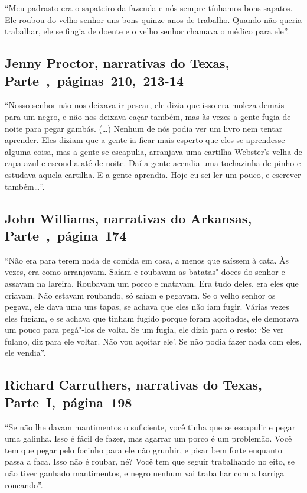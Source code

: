 ``Meu padrasto era o sapateiro da fazenda e nós sempre tínhamos bons
sapatos. Ele roubou do velho senhor uns bons quinze anos de trabalho.
Quando não queria trabalhar, ele se fingia de doente e o velho senhor
chamava o médico para ele''.

\subsection{Jenny Proctor, narrativas do Texas, Parte~,~páginas~210,~213-14}
\label{ref219}

``Nosso senhor não nos deixava ir pescar, ele dizia que isso era moleza
demais para um negro, e não nos deixava caçar também, mas às vezes a
gente fugia de noite para pegar gambás. (\ldots{}) Nenhum de nós podia
ver um livro nem tentar aprender. Eles diziam que a gente ia ficar mais
esperto que eles se aprendesse alguma coisa, mas a gente se escapulia,
arranjava uma cartilha Webster's velha de capa azul e escondia até de %
noite. Daí a gente acendia uma tochazinha de pinho e estudava aquela
cartilha. E a gente aprendia. Hoje eu sei ler um pouco, e escrever
também\ldots{}''.

\subsection{John Williams, narrativas do Arkansas, Parte~,~página~174}
\label{ref292}

``Não era para terem nada de comida em casa, a menos que saíssem à cata.
Às vezes, era como arranjavam. Saíam e roubavam as batatas"-doces do
senhor e assavam na lareira. Roubavam um porco e matavam. Era tudo
deles, era eles que criavam. Não estavam roubando, só saíam e pegavam. %
Se o velho senhor os pegava, ele dava uma uns tapas, se achava que eles %
não iam fugir. Várias vezes eles fugiam, e se achava que tinham fugido
porque foram açoitados, ele demorava um pouco para pegá"-los de volta. Se
um fugia, ele dizia para o resto: `Se ver fulano, diz para ele voltar.
Não vou açoitar ele'. Se não podia fazer nada com eles, ele vendia''.

\subsection{Richard Carruthers, narrativas do Texas, Parte~I,~página~198} \label{ref50}

``Se não lhe davam mantimentos o suficiente, você tinha que se escapulir
e pegar uma galinha. Isso é fácil de fazer, mas agarrar um porco é um
problemão. Você tem que pegar pelo focinho para ele não grunhir, e pisar
bem forte enquanto passa a faca. Isso não é roubar, né? Você tem que
seguir trabalhando no eito, se não tiver ganhado mantimentos, e negro
nenhum vai trabalhar com a barriga roncando''.

